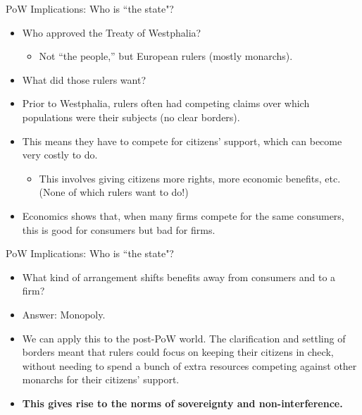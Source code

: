 \documentclass[handout]{beamer}
\begin{document}
\begin{frame}{\LARGE PoW Implications: Who is ``the state"?}
	\begin{itemize}
		\item Who approved the Treaty of Westphalia? \pause
		\begin{itemize}
			\item Not ``the people,” but European rulers (mostly monarchs).
		\end{itemize}
		\item What did those rulers want? \pause
		\item Prior to Westphalia, rulers often had competing claims over which populations were their subjects (no clear borders). \pause
		\item This means they have to compete for citizens’ support, which can become very costly to do.
		\begin{itemize}
			\item This involves giving citizens more rights, more economic benefits, etc. (None of which rulers want to do!)
		\end{itemize}
		\item Economics shows that, when many firms compete for the same consumers, this is good for consumers but bad for firms.		
	\end{itemize}
\end{frame}

\begin{frame}{\LARGE PoW Implications: Who is ``the state"?}
\begin{itemize}
	\item What kind of arrangement shifts benefits away from consumers and to a firm? \pause
	\item Answer: Monopoly. \pause
	\item We can apply this to the post-PoW world. The clarification and settling of borders meant that rulers could focus on keeping their citizens in check, without needing to spend a bunch of extra resources competing against other monarchs for their citizens' support. 
	\item \textbf{This gives rise to the norms of sovereignty and non-interference.} 
\end{itemize}
\end{frame}
\end{document}
